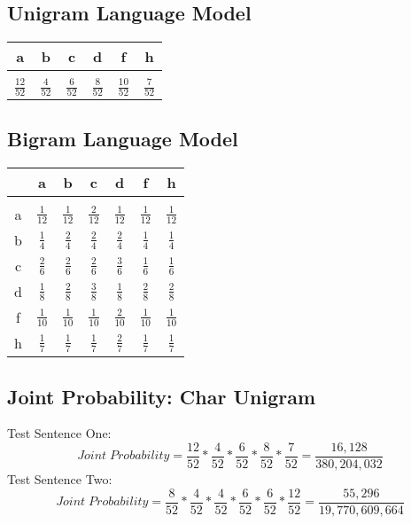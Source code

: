 \documentclass{article}
\begin{document}
\subsection{Unigram Language Model}
\begin{center}
\begin{tabular}{c c c c c c} 
\hline\hline
a&b&c&d&f&h \\
\hline\hline
\\
	\(\frac{12}{52}\)&\(\frac{4}{52}\)&\(\frac{6}{52}\)&\(\frac{8}{52}\)&\(\frac{10}{52}\)&\(\frac{7}{52}\) \\ [2ex]
\hline
\end{tabular}
\end{center}
\subsection{Bigram Language Model}
\begin{center}
\begin{tabular}{c|| c c c c c c} 
\hline\hline
	&	a&		b&			c&			d&			f&			h \\
\hline\hline
\\
a	&\(\frac{1}{12}\)	&\(\frac{1}{12}\)	&\(\frac{2}{12}\)	&\(\frac{1}{12}\)	&\(\frac{1}{12}\)	&\(\frac{1}{12}\) \\ [2ex]
b	&\(\frac{1}{4}\)	&\(\frac{2}{4}\)	&\(\frac{2}{4}\)	&\(\frac{2}{4}\)	&\(\frac{1}{4}\)	&\(\frac{1}{4}\) \\ [2ex]
c	&\(\frac{2}{6}\)	&\(\frac{2}{6}\)	&\(\frac{2}{6}\)	&\(\frac{3}{6}\)	&\(\frac{1}{6}\)	&\(\frac{1}{6}\) \\ [2ex]
d	&\(\frac{1}{8}\)	&\(\frac{2}{8}\)	&\(\frac{3}{8}\)	&\(\frac{1}{8}\)	&\(\frac{2}{8}\)	&\(\frac{2}{8}\) \\ [2ex]
f	&\(\frac{1}{10}\)	&\(\frac{1}{10}\)	&\(\frac{1}{10}\)	&\(\frac{2}{10}\)	&\(\frac{1}{10}\)	&\(\frac{1}{10}\) \\ [2ex]
h	&\(\frac{1}{7}\)	&\(\frac{1}{7}\)	&\(\frac{1}{7}\)	&\(\frac{2}{7}\)	&\(\frac{1}{7}\)	&\(\frac{1}{7}\) \\ [2ex]
\hline
\end{tabular}
\end{center}

\subsection{Joint Probability: Char Unigram} 
Test Sentence One: 
\begin{equation}
	Joint\;Probability = \frac{12}{52}*\frac{4}{52}*\frac{6}{52}*\frac{8}{52}*\frac{7}{52} = \frac{16,128}{380,204,032} \label{Test Case One}
\end{equation}
Test Sentence Two: 
\begin{equation}
	Joint\;Probability = \frac{8}{52}*\frac{4}{52}*\frac{4}{52}*\frac{6}{52}*\frac{6}{52}*\frac{12}{52} = \frac{55,296}{19,770,609,664} \label{Test Case One}
\end{equation}
\end{document}
